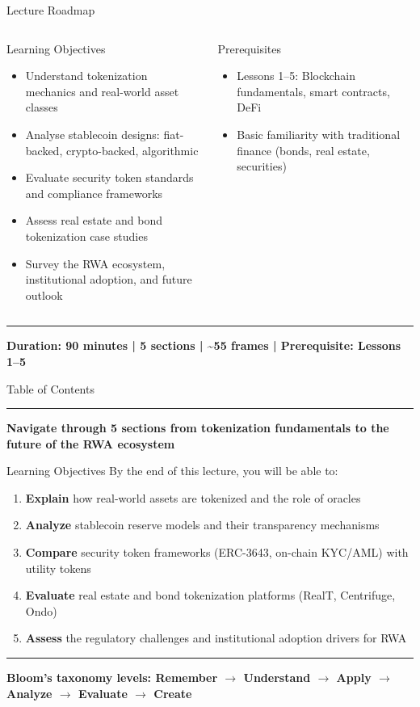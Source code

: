\documentclass[8pt,aspectratio=169]{beamer}
\newcommand{\bottomnote}[1]{\vfill\vspace{-2mm}\textcolor{mllavender2}{\rule{\textwidth}{0.4pt}}\vspace{1mm}\footnotesize\textbf{#1}}
\begin{document}
\begin{frame}{Lecture Roadmap}
\begin{columns}[T]
\begin{block}{Learning Objectives}
\footnotesize
\begin{itemize}
  \item Understand tokenization mechanics and real-world asset classes
  \item Analyse stablecoin designs: fiat-backed, crypto-backed, algorithmic
  \item Evaluate security token standards and compliance frameworks
  \item Assess real estate and bond tokenization case studies
  \item Survey the RWA ecosystem, institutional adoption, and future outlook
\end{itemize}
\end{block}
\vspace{1mm}
\begin{block}{Prerequisites}
\footnotesize
\begin{itemize}
  \item Lessons 1--5: Blockchain fundamentals, smart contracts, DeFi
  \item Basic familiarity with traditional finance (bonds, real estate, securities)
\end{itemize}
\end{block}
\end{columns}
\bottomnote{Duration: 90 minutes | 5 sections | \textasciitilde55 frames | Prerequisite: Lessons 1--5}
\end{frame}

\begin{frame}{Table of Contents}
\tableofcontents
\bottomnote{Navigate through 5 sections from tokenization fundamentals to the future of the RWA ecosystem}
\end{frame}

\begin{frame}{Learning Objectives}
By the end of this lecture, you will be able to:
\begin{enumerate}
\item \textbf{Explain} how real-world assets are tokenized and the role of oracles
\item \textbf{Analyze} stablecoin reserve models and their transparency mechanisms
\item \textbf{Compare} security token frameworks (ERC-3643, on-chain KYC/AML) with utility tokens
\item \textbf{Evaluate} real estate and bond tokenization platforms (RealT, Centrifuge, Ondo)
\item \textbf{Assess} the regulatory challenges and institutional adoption drivers for RWA
\end{enumerate}
\bottomnote{Bloom's taxonomy levels: Remember $\rightarrow$ Understand $\rightarrow$ Apply $\rightarrow$ Analyze $\rightarrow$ Evaluate $\rightarrow$ Create}
\end{frame}
\end{document}
